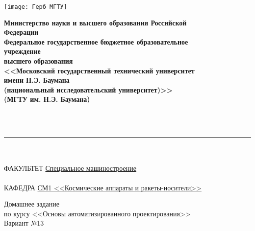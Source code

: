 \begin{minipage}{0.2\linewidth}
    \texttt{[image: Герб МГТУ]}
\end{minipage}
\begin{minipage}{0.8\linewidth}
    \begin{center}
        \begin{singlespace}
            \textbf{Министерство науки и высшего образования Российской \\ Федерации \\ Федеральное государственное бюджетное образовательное \\ учреждение \\ высшего образования \\ <<Московский государственный технический университет \\ имени Н.Э. Баумана \\ (национальный исследовательский университет)>> \\ (МГТУ им. Н.Э. Баумана)}
        \end{singlespace}
    \end{center}
\end{minipage}
\\
\\
\rule{\linewidth}{2pt} %
\\
\\
ФАКУЛЬТЕТ \underline{\hspace{0.25\linewidth} Специальное машиностроение \hspace{0.25\linewidth}}
\\
\\
КАФЕДРА \underline{\hspace{0.16\linewidth} СМ1 <<Космические аппараты и ракеты-носители>> \hspace{0.16\linewidth}}
\\
\vspace{2cm}
\begin{center}
    \begin{minipage}{0.8\linewidth}
        \begin{center}
            \large Домашнее задание \\ по курсу <<Основы автоматизированного проектирования>>
            \\[10pt]
            \large Вариант №13
        \end{center}
    \end{minipage}
\end{center}
